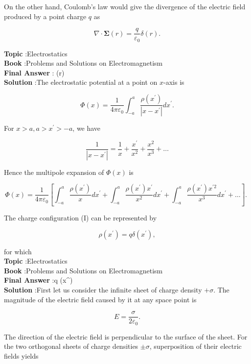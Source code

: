\documentclass[10pt]{article}
\begin{document}
On the other hand, Coulomb's law would give the divergence of the electric field produced by a point charge $q$ as

$$
\nabla \cdot \mathbf{\Sigma}(r)=\frac{q}{\varepsilon_{0}} \delta(r) .
$$


\textbf{Topic} :Electrostatics\\
\textbf{Book} :Problems and Solutions on Electromagnetism\\
\textbf{Final Answer} : \delta(r)\\


\textbf{Solution} :The electrostatic potential at a point on $x$-axis is

$$
\Phi(x)=\frac{1}{4 \pi \varepsilon_{0}} \int_{-a}^{a} \frac{\rho\left(x^{\prime}\right)}{\left|x-x^{\prime}\right|} d x^{\prime} .
$$

 For $x>a, a>x^{\prime}>-a$, we have

$$
\frac{1}{\left|x-x^{\prime}\right|}=\frac{1}{x}+\frac{x^{\prime}}{x^{2}}+\frac{x^{2}}{x^{3}}+\ldots
$$

Hence the multipole expansion of $\Phi(x)$ is

$$
\Phi(x)=\frac{1}{4 \pi \varepsilon_{0}}\left[\int_{-a}^{a} \frac{\rho\left(x^{\prime}\right)}{x} d x^{\prime}+\int_{-a}^{a} \frac{\rho\left(x^{\prime}\right) x^{\prime}}{x^{2}} d x^{\prime}+\int_{-a}^{a} \frac{\rho\left(x^{\prime}\right) x^{\prime 2}}{x^{3}} d x^{\prime}+\ldots\right] \text {. }
$$

 The charge configuration (I) can be represented by

$$
\rho\left(x^{\prime}\right)=q \delta\left(x^{\prime}\right),
$$

for which
\\
\textbf{Topic} :Electrostatics\\
\textbf{Book} :Problems and Solutions on Electromagnetism\\
\textbf{Final Answer} :q \delta\left(x^{\prime}\right)\\


\textbf{Solution} :First let us consider the infinite sheet of charge density $+\sigma$. The magnitude of the electric field caused by it at any space point is

$$
E=\frac{\sigma}{2 \varepsilon_{0}} .
$$

The direction of the electric field is perpendicular to the surface of the sheet. For the two orthogonal sheets of charge densities $\pm \sigma$, superposition of their electric fields yields
\end{document}
